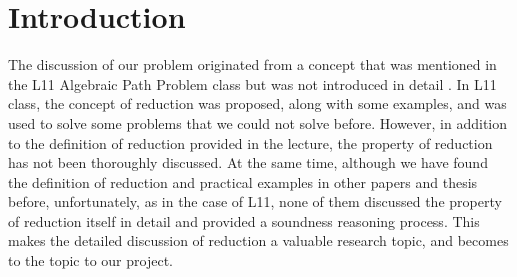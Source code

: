 \documentclass[a4paper,12pt,twoside,openright]{report}
\begin{document}
\pagestyle{empty}
\singlespacing

\onehalfspacing

\singlespacing


\setcounter{page}{0}
\pagestyle{plain}
\tableofcontents
\listoffigures


\renewcommand{\lstlistlistingname}{List of Listings}
%
%

\onehalfspacing


\chapter{Introduction}
\setcounter{page}{1} 

%
%

The discussion of our problem originated from a concept that was mentioned in the L11 Algebraic Path Problem class but was not introduced in detail \cite{griffin_2017}. In L11 class, the concept of reduction was proposed, along with some examples, and was used to solve some problems that we could not solve before. However, in addition to the definition of reduction provided in the lecture, the property of reduction has not been thoroughly discussed. At the same time, although we have found the definition of reduction and practical examples in other papers and thesis before, unfortunately, as in the case of L11, none of them discussed the property of reduction itself in detail and provided a soundness reasoning process. This makes the detailed discussion of reduction a valuable research topic, and becomes to the topic to our project.
\end{document}
